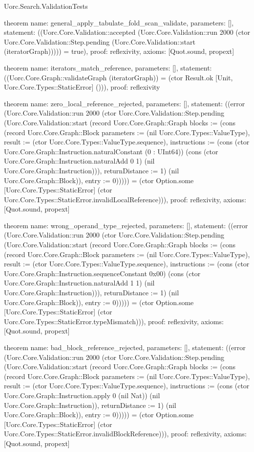 \begin{lexlean}{Uorc.Search.ValidationTests}
\begin{semanticmodule}
theorem{
  name: general_apply_tabulate_fold_scan_validate,
  parameters: [],
  statement: ((Uorc.Core.Validation::accepted (Uorc.Core.Validation::run 2000 (ctor Uorc.Core.Validation::Step.pending (Uorc.Core.Validation::start (iteratorGraph))))) = true),
  proof: reflexivity{},
  axioms: [Quot.sound, propext]
}

theorem{
  name: iterators_match_reference,
  parameters: [],
  statement: ((Uorc.Core.Graph::validateGraph (iteratorGraph)) = (ctor Result.ok [Unit, Uorc.Core.Types::StaticError] ())),
  proof: reflexivity{}
}

theorem{
  name: zero_local_reference_rejected,
  parameters: [],
  statement: ((error (Uorc.Core.Validation::run 2000 (ctor Uorc.Core.Validation::Step.pending (Uorc.Core.Validation::start (record Uorc.Core.Graph::Graph {blocks := (cons (record Uorc.Core.Graph::Block {parameters := (nil Uorc.Core.Types::ValueType), result := (ctor Uorc.Core.Types::ValueType.sequence), instructions := (cons (ctor Uorc.Core.Graph::Instruction.naturalConstant (0 : UInt64)) (cons (ctor Uorc.Core.Graph::Instruction.naturalAdd 0 1) (nil Uorc.Core.Graph::Instruction))), returnDistance := 1}) (nil Uorc.Core.Graph::Block)), entry := 0}))))) = (ctor Option.some [Uorc.Core.Types::StaticError] (ctor Uorc.Core.Types::StaticError.invalidLocalReference))),
  proof: reflexivity{},
  axioms: [Quot.sound, propext]
}

theorem{
  name: wrong_operand_type_rejected,
  parameters: [],
  statement: ((error (Uorc.Core.Validation::run 2000 (ctor Uorc.Core.Validation::Step.pending (Uorc.Core.Validation::start (record Uorc.Core.Graph::Graph {blocks := (cons (record Uorc.Core.Graph::Block {parameters := (nil Uorc.Core.Types::ValueType), result := (ctor Uorc.Core.Types::ValueType.sequence), instructions := (cons (ctor Uorc.Core.Graph::Instruction.sequenceConstant 0x00) (cons (ctor Uorc.Core.Graph::Instruction.naturalAdd 1 1) (nil Uorc.Core.Graph::Instruction))), returnDistance := 1}) (nil Uorc.Core.Graph::Block)), entry := 0}))))) = (ctor Option.some [Uorc.Core.Types::StaticError] (ctor Uorc.Core.Types::StaticError.typeMismatch))),
  proof: reflexivity{},
  axioms: [Quot.sound, propext]
}

theorem{
  name: bad_block_reference_rejected,
  parameters: [],
  statement: ((error (Uorc.Core.Validation::run 2000 (ctor Uorc.Core.Validation::Step.pending (Uorc.Core.Validation::start (record Uorc.Core.Graph::Graph {blocks := (cons (record Uorc.Core.Graph::Block {parameters := (nil Uorc.Core.Types::ValueType), result := (ctor Uorc.Core.Types::ValueType.sequence), instructions := (cons (ctor Uorc.Core.Graph::Instruction.apply 0 (nil Nat)) (nil Uorc.Core.Graph::Instruction)), returnDistance := 1}) (nil Uorc.Core.Graph::Block)), entry := 0}))))) = (ctor Option.some [Uorc.Core.Types::StaticError] (ctor Uorc.Core.Types::StaticError.invalidBlockReference))),
  proof: reflexivity{},
  axioms: [Quot.sound, propext]
}


\end{semanticmodule}
\end{lexlean}
